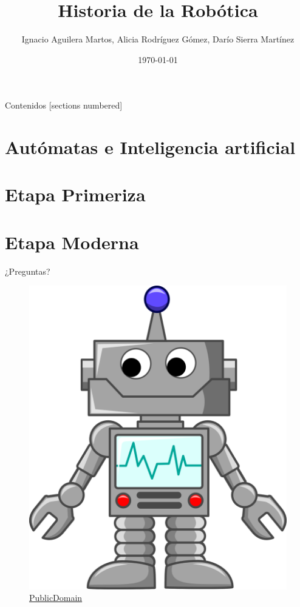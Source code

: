 \documentclass[10pt]{beamer}
\title{Historia de la Robótica}
\author{Ignacio Aguilera Martos, Alicia Rodríguez Gómez, Darío Sierra Martínez}
\date{\today}
\institute{Historia de las Matemáticas \\ \href{https://github.com/nacheteam/Historia-Robotica}{Trabajo completo en GitHub}}
\begin{document}
\maketitle

\begin{frame}[fragile]{Contenidos}
  [sections numbered]
  \tableofcontents[hideallsubsections]
\end{frame}

\section{Autómatas e Inteligencia artificial}

\section{Etapa Primeriza}


\section{Etapa Moderna}



\begin{frame}[standout]
	\LARGE{¿Preguntas?}
	\vspace{10px}
	\begin{figure}
		\includegraphics[scale=0.3]{./Imagenes/preguntas.png}
		\caption*{\href{http://www.publicdomainfiles.com/show_file.php?id=13539934212140}{PublicDomain}}
	\end{figure}
\end{frame}
\end{document}

